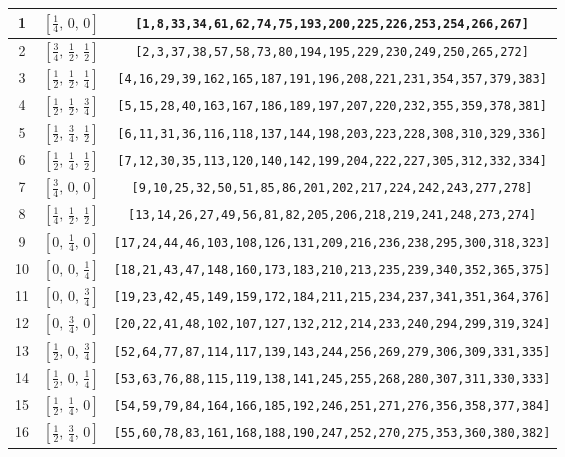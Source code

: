 \documentclass[fleqn,8pt]{jsarticle}
\begin{document}
\begin{longtable}{ccc}
1 & $\left[ \frac{1}{4},\, 0,\, 0 \right]$ & {\tt [1,8,33,34,61,62,74,75,193,200,225,226,253,254,266,267]} \\ \hline
2 & $\left[ \frac{3}{4},\, \frac{1}{2},\, \frac{1}{2} \right]$ & {\tt [2,3,37,38,57,58,73,80,194,195,229,230,249,250,265,272]} \\ \hline
3 & $\left[ \frac{1}{2},\, \frac{1}{2},\, \frac{1}{4} \right]$ & {\tt [4,16,29,39,162,165,187,191,196,208,221,231,354,357,379,383]} \\ \hline
4 & $\left[ \frac{1}{2},\, \frac{1}{2},\, \frac{3}{4} \right]$ & {\tt [5,15,28,40,163,167,186,189,197,207,220,232,355,359,378,381]} \\ \hline
5 & $\left[ \frac{1}{2},\, \frac{3}{4},\, \frac{1}{2} \right]$ & {\tt [6,11,31,36,116,118,137,144,198,203,223,228,308,310,329,336]} \\ \hline
6 & $\left[ \frac{1}{2},\, \frac{1}{4},\, \frac{1}{2} \right]$ & {\tt [7,12,30,35,113,120,140,142,199,204,222,227,305,312,332,334]} \\ \hline
7 & $\left[ \frac{3}{4},\, 0,\, 0 \right]$ & {\tt [9,10,25,32,50,51,85,86,201,202,217,224,242,243,277,278]} \\ \hline
8 & $\left[ \frac{1}{4},\, \frac{1}{2},\, \frac{1}{2} \right]$ & {\tt [13,14,26,27,49,56,81,82,205,206,218,219,241,248,273,274]} \\ \hline
9 & $\left[ 0,\, \frac{1}{4},\, 0 \right]$ & {\tt [17,24,44,46,103,108,126,131,209,216,236,238,295,300,318,323]} \\ \hline
10 & $\left[ 0,\, 0,\, \frac{1}{4} \right]$ & {\tt [18,21,43,47,148,160,173,183,210,213,235,239,340,352,365,375]} \\ \hline
11 & $\left[ 0,\, 0,\, \frac{3}{4} \right]$ & {\tt [19,23,42,45,149,159,172,184,211,215,234,237,341,351,364,376]} \\ \hline
12 & $\left[ 0,\, \frac{3}{4},\, 0 \right]$ & {\tt [20,22,41,48,102,107,127,132,212,214,233,240,294,299,319,324]} \\ \hline
13 & $\left[ \frac{1}{2},\, 0,\, \frac{3}{4} \right]$ & {\tt [52,64,77,87,114,117,139,143,244,256,269,279,306,309,331,335]} \\ \hline
14 & $\left[ \frac{1}{2},\, 0,\, \frac{1}{4} \right]$ & {\tt [53,63,76,88,115,119,138,141,245,255,268,280,307,311,330,333]} \\ \hline
15 & $\left[ \frac{1}{2},\, \frac{1}{4},\, 0 \right]$ & {\tt [54,59,79,84,164,166,185,192,246,251,271,276,356,358,377,384]} \\ \hline
16 & $\left[ \frac{1}{2},\, \frac{3}{4},\, 0 \right]$ & {\tt [55,60,78,83,161,168,188,190,247,252,270,275,353,360,380,382]} \\ \hline

\end{longtable}
\end{document}

